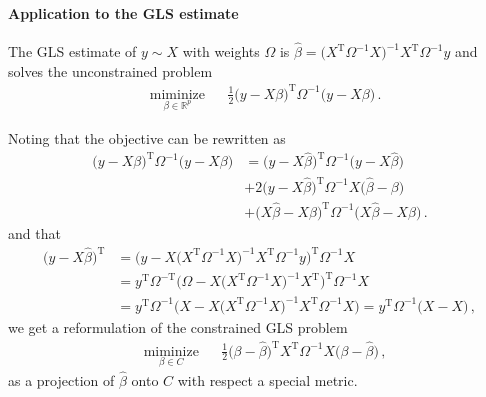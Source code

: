 \documentclass[a4paper]{article}
\newcommand{\real}{\mathbb{R}}
\newcommand{\T}{\mathrm{T}}
\begin{document}
\paragraph{Application to the GLS estimate} %
\label{par:application_to_the_gls_estimate}

The GLS estimate of $y\sim X$ with weights $\Omega$ is $\hat{\beta} = \bigl(X^\T \Omega^{-1} X
\bigr)^{-1} X^\T \Omega^{-1} y$ and solves the unconstrained problem
\begin{equation} \label{eq:gls_unc}
  \begin{aligned}
    & \underset{\beta\in \real^p}{\text{miminize}}
      & & \tfrac12 \bigl(y - X \beta\bigr)^\T \Omega^{-1} \bigl(y - X \beta\bigr)
          \,.
  \end{aligned}
\end{equation}

Noting that the objective can be rewritten as
\begin{align*}
  \bigl(y - X \beta\bigr)^\T \Omega^{-1} \bigl(y - X \beta\bigr)
    &= \bigl(y - X \hat{\beta}\bigr)^\T \Omega^{-1} \bigl(y - X \hat{\beta}\bigr)
    \\
    &+ 2 \bigl(y - X \hat{\beta}\bigr)^\T \Omega^{-1} X \bigl(\hat{\beta} - \beta\bigr)
    \\
    &+ \bigl(X \hat{\beta} - X \beta\bigr)^\T \Omega^{-1} \bigl(X \hat{\beta} - X \beta\bigr)
    \,.
\end{align*}
and that
\begin{align*}
  \bigl(y - X \hat{\beta}\bigr)^\T
    &= \bigl(y - X \bigl(X^\T \Omega^{-1} X \bigr)^{-1} X^\T \Omega^{-1} y\bigr)^\T \Omega^{-1} X
    \\
    &= y^\T \Omega^{-\T} \bigl(\Omega - X \bigl(X^\T \Omega^{-1} X \bigr)^{-1} X^\T \bigr)^\T \Omega^{-1} X
    \\
    &= y^\T \Omega^{-1} \bigl(X - X \bigl(X^\T \Omega^{-1} X \bigr)^{-1} X^\T \Omega^{-1} X \bigr)
    = y^\T \Omega^{-1} \bigl(X - X\bigr)
    \,,
\end{align*}
we get a reformulation of the constrained GLS problem
\begin{equation} \label{eq:gls_proj}
  \begin{aligned}
    & \underset{\beta\in C}{\text{miminize}}
      & & \tfrac12 \bigl(\beta - \hat{\beta} \bigr)^\T X^\T \Omega^{-1} X \bigl(\beta - \hat{\beta}\bigr)
          \,,
  \end{aligned}
\end{equation}
as a projection of $\hat{\beta}$ onto $C$ with respect a special metric.

\end{document}
